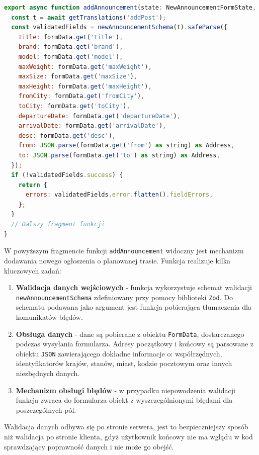 {\belowcaptionskip=-9pt
\begin{lstlisting}[language=JavaScript,caption=Wstępna walidacja danych przed dodaniem ogłoszenia do bazy danych, label=lst:addAnnouncement]
export async function addAnnouncement(state: NewAnnouncementFormState, formData: FormData) {
  const t = await getTranslations('addPost');
  const validatedFields = newAnnouncementSchema(t).safeParse({
    title: formData.get('title'),
    brand: formData.get('brand'),
    model: formData.get('model'),
    maxWeight: formData.get('maxWeight'),
    maxSize: formData.get('maxSize'),
    maxHeight: formData.get('maxHeight'),
    fromCity: formData.get('fromCity'),
    toCity: formData.get('toCity'),
    departureDate: formData.get('departureDate'),
    arrivalDate: formData.get('arrivalDate'),
    desc: formData.get('desc'),
    from: JSON.parse(formData.get('from') as string) as Address,
    to: JSON.parse(formData.get('to') as string) as Address,
  });
  if (!validatedFields.success) {
    return {
      errors: validatedFields.error.flatten().fieldErrors,
    };
  }
  // Dalszy fragment funkcji
}
\end{lstlisting}
}

W powyższym fragmencie funkcji \texttt{addAnnouncement} widoczny jest mechanizm dodawania nowego ogłoszenia o planowanej trasie. Funkcja realizuje kilka kluczowych zadań:
\begin{enumerate}
    \item \textbf{Walidacja danych wejściowych} - funkcja wykorzystuje schemat walidacji \texttt{newAnnouncementSchema} zdefiniowany przy pomocy biblioteki \texttt{Zod}. Do schematu podawana jako argument jest funkcja pobierająca tłumaczenia dla komunikatów błędów.
    \item \textbf{Obsługa danych} - dane są pobierane z obiektu \texttt{FormData}, dostarczanego podczas wysyłania formularza. Adresy początkowy i końcowy są parsowane z obiektu \texttt{JSON} zawierającego dokładne informacje o: współrzędnych, identyfikatorów krajów, stanów, miast, kodzie pocztowym oraz innych niezbędnych danych.
    \item \textbf{Mechanizm obsługi błędów} - w przypadku niepowodzenia walidacji funkcja zwraca do formularza obiekt z wyszczególnionymi błędami dla poszczególnych pól.
\end{enumerate}

Walidacja danych odbywa się po stronie serwera, jest to bezpieczniejszy sposób niż walidacja po stronie klienta, gdyż użytkownik końcowy nie ma wglądu w kod sprawdzający poprawność danych i nie może go obejść.

